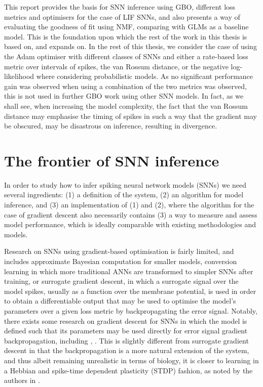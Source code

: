 \documentclass[mphil,deptreport,ianc]{infthesis} %
\begin{document}



This report provides the basis for SNN inference using GBO, different loss metrics and optimisers for the case of LIF SNNs, and also presents a way of evaluating the goodness of fit using NMF, comparing with GLMs as a baseline model.
This is the foundation upon which the rest of the work in this thesis is based on, and expands on.
In the rest of this thesis, we consider the case of using the Adam optimiser with different classes of SNNs and either a rate-based loss metric over intervals of spikes, the van Rossum distance, or the negative log-likelihood where considering probabilistic models.
As no significant performance gain was observed when using a combination of the two metrics was observed, this is not used in further GBO work using other SNN models.
In fact, as we shall see, when increasing the model complexity, the fact that the van Rossum distance may emphasise the timing of spikes in such a way that the gradient may be obscured, may be disastrous on inference, resulting in divergence.


\chapter{The frontier of SNN inference}\label{chpt:frontier}

In order to study how to infer spiking neural network models (SNNs) we need several ingredients: (1) a definition of the system, (2) an algorithm for model inference, and (3) an implementation of (1) and (2), where the algorithm for the case of gradient descent also necessarily contains (3) a way to measure and assess model performance, which is ideally comparable with existing methodologies and models.

Research on SNNs using gradient-based optimisation is fairly limited, and includes approximate Bayesian computation for smaller models, conversion learning in which more traditional ANNs are transformed to simpler SNNs after training, or surrogate gradient descent, in which a surrogate signal over the model spikes, usually as a function over the membrane potential, is used in order to obtain a differentiable output that may be used to optimise the model's parameters over a given loss metric by backpropagating the error signal. Notably, there exists some research on gradient descent for SNNs in which the model is defined such that its parameters may be used directly for error signal gradient backpropagation, including \cite{Huh2017}, \cite{Rene2020}. This is slightly different from surrogate gradient descent in that the backpropagation is a more natural extension of the system, and thus albeit remaining unrealistic in terms of biology, it is closer to learning in a Hebbian and spike-time dependent plasticity (STDP) fashion, as noted by the authors in \cite{Huh2017}.
\end{document}
